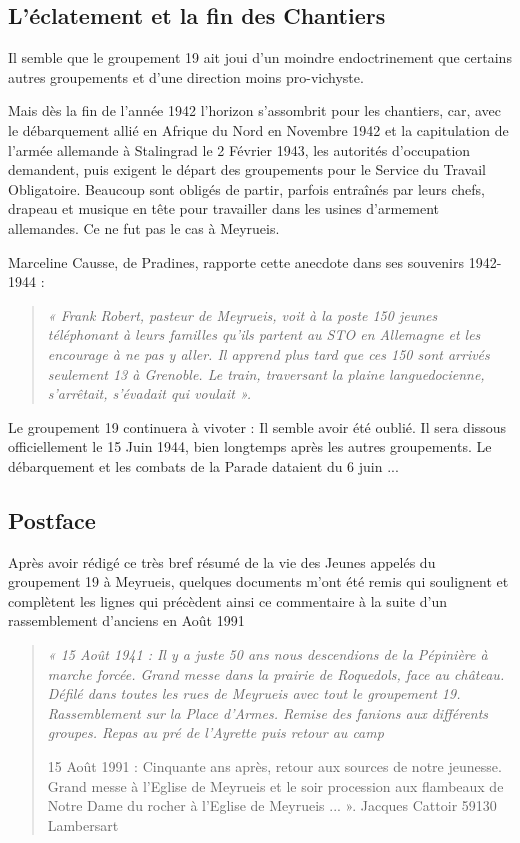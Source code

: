 \newpage


\subsection{L’éclatement et la fin des Chantiers}

Il semble que le groupement 19 ait joui d’un moindre endoctrinement que certains
autres groupements et d’une direction moins pro-vichyste.

Mais dès la fin de l’année 1942 l’horizon s’assombrit pour les chantiers, car, avec le
débarquement allié en Afrique du Nord en Novembre 1942 et la capitulation de
l’armée allemande à Stalingrad le 2 Février 1943, les autorités d’occupation
demandent, puis exigent le départ des groupements pour le Service du Travail
Obligatoire. Beaucoup sont obligés de partir, parfois entraînés par leurs chefs,
drapeau et musique en tête pour travailler dans les usines d’armement allemandes. Ce
ne fut pas le cas à Meyrueis.

Marceline Causse, de Pradines, rapporte cette anecdote dans ses souvenirs 1942-
1944 :

\begin{quote}\itshape
« Frank Robert, pasteur de Meyrueis, voit à la poste 150 jeunes téléphonant à leurs familles qu’ils
partent au STO en Allemagne et les encourage à ne pas y aller. Il apprend plus tard que ces 150 sont
arrivés seulement 13 à Grenoble. Le train, traversant la plaine languedocienne, s’arrêtait, s’évadait
qui voulait ».
\end{quote}

Le groupement 19 continuera à vivoter : Il semble avoir été oublié. Il sera dissous
officiellement le 15 Juin 1944, bien longtemps après les autres groupements. Le
débarquement et les combats de la Parade dataient du 6 juin ...

\subsection{Postface}

Après avoir rédigé ce très bref résumé de la vie des Jeunes appelés du groupement 19
à Meyrueis, quelques documents m’ont été remis qui soulignent et complètent les
lignes qui précèdent ainsi ce commentaire à la suite d’un rassemblement d’anciens
en Août 1991

\begin{quote}\itshape
« 15 Août 1941 : Il y a juste 50 ans nous descendions de la Pépinière à marche
forcée. Grand messe dans la prairie de Roquedols, face au château. Défilé dans
toutes les rues de Meyrueis avec tout le groupement 19. Rassemblement sur la Place
d’Armes. Remise des fanions aux différents groupes. Repas au pré de l’Ayrette puis
retour au camp

15 Août 1991 : Cinquante ans après, retour aux sources de notre jeunesse. Grand
messe à l’Eglise de Meyrueis et le soir procession aux flambeaux de Notre Dame du
rocher à l’Eglise de Meyrueis ... ». Jacques Cattoir 59130 Lambersart
\end{quote}

